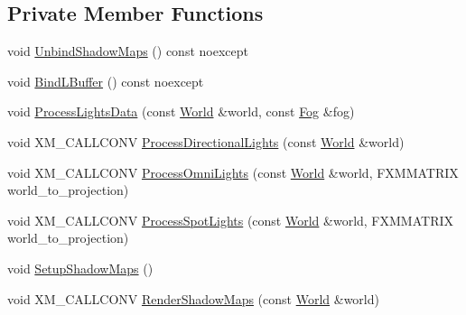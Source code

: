 \subsection*{Private Member Functions}
\begin{DoxyCompactItemize}
\item 
void \hyperlink{classmage_1_1rendering_1_1_l_buffer_pass_ac456e0612e540d215d8c709e705ade20}{Unbind\+Shadow\+Maps} () const noexcept
\item 
void \hyperlink{classmage_1_1rendering_1_1_l_buffer_pass_a23370698fd80713b0ea31e1d54a35d44}{Bind\+L\+Buffer} () const noexcept
\item 
void \hyperlink{classmage_1_1rendering_1_1_l_buffer_pass_a7f9034c92091a346bbd71f59426861ea}{Process\+Lights\+Data} (const \hyperlink{classmage_1_1rendering_1_1_world}{World} \&world, const \hyperlink{classmage_1_1rendering_1_1_fog}{Fog} \&fog)
\item 
void X\+M\+\_\+\+C\+A\+L\+L\+C\+O\+NV \hyperlink{classmage_1_1rendering_1_1_l_buffer_pass_a97047b8acf6e4e552ab8f7b7ec08b1be}{Process\+Directional\+Lights} (const \hyperlink{classmage_1_1rendering_1_1_world}{World} \&world)
\item 
void X\+M\+\_\+\+C\+A\+L\+L\+C\+O\+NV \hyperlink{classmage_1_1rendering_1_1_l_buffer_pass_af9e7e859505ec7ee16155f4e11d98a67}{Process\+Omni\+Lights} (const \hyperlink{classmage_1_1rendering_1_1_world}{World} \&world, F\+X\+M\+M\+A\+T\+R\+IX world\+\_\+to\+\_\+projection)
\item 
void X\+M\+\_\+\+C\+A\+L\+L\+C\+O\+NV \hyperlink{classmage_1_1rendering_1_1_l_buffer_pass_a3172ee6a91c34a1dbf252c388fe1ac20}{Process\+Spot\+Lights} (const \hyperlink{classmage_1_1rendering_1_1_world}{World} \&world, F\+X\+M\+M\+A\+T\+R\+IX world\+\_\+to\+\_\+projection)
\item 
void \hyperlink{classmage_1_1rendering_1_1_l_buffer_pass_a405734dad82467908e68217254e4f2ad}{Setup\+Shadow\+Maps} ()
\item 
void X\+M\+\_\+\+C\+A\+L\+L\+C\+O\+NV \hyperlink{classmage_1_1rendering_1_1_l_buffer_pass_a811b69ff4df7d8a24a042a9677c4b67f}{Render\+Shadow\+Maps} (const \hyperlink{classmage_1_1rendering_1_1_world}{World} \&world)
\end{DoxyCompactItemize}

